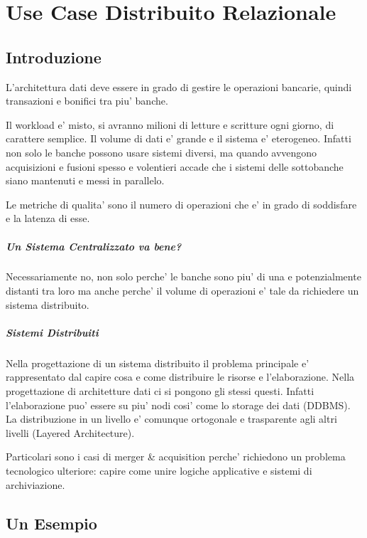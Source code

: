 \chapter{Use Case Distribuito Relazionale}

\section{Introduzione}

L'architettura dati deve essere in grado di gestire le operazioni bancarie, quindi transazioni e bonifici tra piu' banche.

Il workload e' misto, si avranno milioni di letture e scritture ogni giorno, di carattere semplice. Il volume di dati e' grande e il sistema e' eterogeneo.
Infatti non solo le banche possono usare sistemi diversi, ma quando avvengono acquisizioni e fusioni spesso e volentieri accade che i sistemi delle sottobanche siano mantenuti e messi in parallelo.

Le metriche di qualita' sono il numero di operazioni che e' in grado di soddisfare e la latenza di esse.

\paragraph{Un Sistema Centralizzato va bene?}

Necessariamente no, non solo perche' le banche sono piu' di una e potenzialmente distanti tra loro ma anche perche' il volume di operazioni e' tale da richiedere un sistema distribuito.

\paragraph{Sistemi Distribuiti}

Nella progettazione di un sistema distribuito il problema principale e' rappresentato dal capire cosa e come distribuire le risorse e l'elaborazione. Nella progettazione di architetture dati ci si pongono gli stessi questi.
Infatti l'elaborazione puo' essere su piu' nodi cosi' come lo storage dei dati (DDBMS). La distribuzione in un livello e' comunque ortogonale e trasparente agli altri livelli (Layered Architecture).

Particolari sono i casi di merger \& acquisition perche' richiedono un problema tecnologico ulteriore: capire come unire logiche applicative e sistemi di archiviazione.

\section{Un Esempio}

